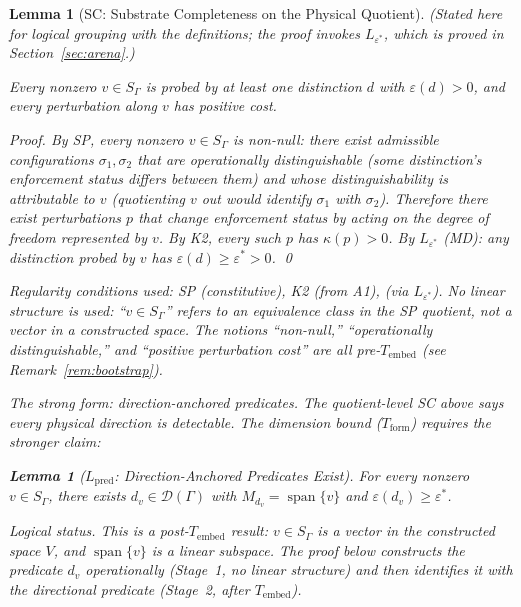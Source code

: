 \documentclass[11pt,a4paper]{article}
\newtheorem{lemma}[theorem]{Lemma}
\theoremstyle{definition}
\newcommand{\eps}{\varepsilon}
\DeclareMathOperator{\spn}{span}
\begin{document}
\begin{lemma}[SC: Substrate Completeness on the Physical Quotient]\label{lem:SC}
\textit{(Stated here for logical grouping with the definitions; the proof invokes $L_{\eps^*}$, which is proved in Section~\ref{sec:arena}.)}

\smallskip\noindent Every nonzero $v \in S_\Gamma$ is probed by at least one distinction $d$ with $\eps(d) > 0$, and every perturbation along $v$ has positive cost.

\noindent\textit{Proof.}  By SP, every nonzero $v \in S_\Gamma$ is non-null: there exist admissible configurations $\sigma_1, \sigma_2$ that are operationally distinguishable (some distinction's enforcement status differs between them) and whose distinguishability is attributable to $v$ (quotienting $v$ out would identify $\sigma_1$ with $\sigma_2$).  Therefore there exist perturbations $p$ that change enforcement status by acting on the degree of freedom represented by $v$.  By K2, every such $p$ has $\kappa(p) > 0$.  By $L_{\eps^*}$ (MD): any distinction probed by $v$ has $\eps(d) \ge \eps^* > 0$.  \qed

\noindent\textit{Regularity conditions used:} SP (constitutive), K2 (from A1),  (via $L_{\eps^*}$).  \textit{No linear structure is used:} ``$v \in S_\Gamma$'' refers to an equivalence class in the SP quotient, not a vector in a constructed space.  The notions ``non-null,'' ``operationally distinguishable,'' and ``positive perturbation cost'' are all pre-$T_{\mathrm{embed}}$ (see Remark~\ref{rem:bootstrap}).

\smallskip\noindent\textit{The strong form: direction-anchored predicates.}  The quotient-level SC above says every physical direction is detectable.  The dimension bound ($T_{\mathrm{form}}$) requires the stronger claim:

\begin{lemma}[$L_{\mathrm{pred}}$: Direction-Anchored Predicates Exist]\label{lem:pred}
For every nonzero $v \in S_\Gamma$, there exists $d_v \in \mathcal{D}(\Gamma)$ with $M_{d_v} = \spn\{v\}$ and $\eps(d_v) \ge \eps^*$.

\smallskip\noindent\textit{Logical status.}  This is a post-$T_{\mathrm{embed}}$ result: $v \in S_\Gamma$ is a vector in the constructed space $V$, and $\spn\{v\}$ is a linear subspace.  The proof below constructs the predicate $d_v$ operationally (Stage~1, no linear structure) and then identifies it with the directional predicate (Stage~2, after $T_{\mathrm{embed}}$).
\end{lemma}


\end{lemma}
\end{document}
